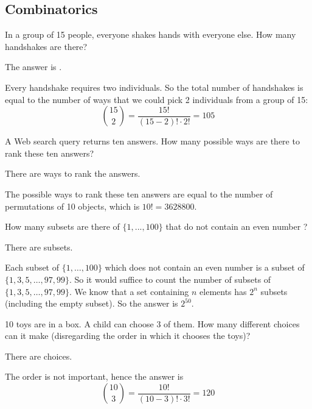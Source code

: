 \documentclass{ximera}
\begin{document}
\subsection*{Combinatorics}

\begin{question}
In a group of 15 people, everyone shakes hands with everyone else.  How many handshakes are there? 
\begin{solution}
The answer is .
\end{solution}
Every handshake requires two individuals. So the total number of handshakes is equal to the number of ways that we could pick 2 individuals from a group of 15:
\[
\binom{15}{2} = \frac{15!}{(15 - 2)! \cdot 2!} = 105
\]
\end{question}

\begin{question}
A Web search query returns ten answers. How many possible ways are there to rank these ten answers?
\begin{solution}
There are  ways to rank the answers.
\end{solution}
The possible ways to rank these ten answers are equal to the number of permutations of 10 objects, which is $10! = 3628800$.
\end{question}

\begin{question}
How many subsets are there of $\{1, ... , 100\}$ that do not contain an even number ? 
\begin{solution}
There are  subsets.
\end{solution}
Each subset of $\{1 , \ldots , 100\}$ which does not contain an even number is a subset of $\{1, 3, 5, \ldots , 97, 99\}$. So it would suffice to count the number of subsets of $\{1, 3, 5, \ldots , 97, 99\}$. We know that a set containing $n$ elements has $2^n$ subsets (including the empty subset). So the answer is $2^{50}$.
\end{question}

\begin{question}
10 toys are in a box.  A child can choose 3 of them.  How many different choices can it make (disregarding the order in which it chooses the toys)?  
\begin{solution}
There are  choices.
\end{solution}
The order is not important, hence the answer is
\[
\binom{10}{3} = \frac{10!}{(10-3)! \cdot 3!} = 120
\]
\end{question}
\end{document}
